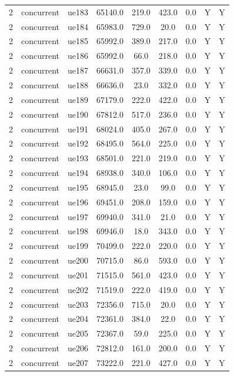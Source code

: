 \begin{table}[ht]
\begin{tabular}{|c|c|c|c|c|c|c|c|c|}
2 & concurrent & ue183 & 65140.0 & 219.0 & 423.0 & 0.0 & Y & Y \\
2 & concurrent & ue184 & 65983.0 & 729.0 & 20.0 & 0.0 & Y & Y \\
2 & concurrent & ue185 & 65992.0 & 389.0 & 217.0 & 0.0 & Y & Y \\
2 & concurrent & ue186 & 65992.0 & 66.0 & 218.0 & 0.0 & Y & Y \\
2 & concurrent & ue187 & 66631.0 & 357.0 & 339.0 & 0.0 & Y & Y \\
2 & concurrent & ue188 & 66636.0 & 23.0 & 332.0 & 0.0 & Y & Y \\
2 & concurrent & ue189 & 67179.0 & 222.0 & 422.0 & 0.0 & Y & Y \\
2 & concurrent & ue190 & 67812.0 & 517.0 & 236.0 & 0.0 & Y & Y \\
2 & concurrent & ue191 & 68024.0 & 405.0 & 267.0 & 0.0 & Y & Y \\
2 & concurrent & ue192 & 68495.0 & 564.0 & 225.0 & 0.0 & Y & Y \\
2 & concurrent & ue193 & 68501.0 & 221.0 & 219.0 & 0.0 & Y & Y \\
2 & concurrent & ue194 & 68938.0 & 340.0 & 106.0 & 0.0 & Y & Y \\
2 & concurrent & ue195 & 68945.0 & 23.0 & 99.0 & 0.0 & Y & Y \\
2 & concurrent & ue196 & 69451.0 & 208.0 & 159.0 & 0.0 & Y & Y \\
2 & concurrent & ue197 & 69940.0 & 341.0 & 21.0 & 0.0 & Y & Y \\
2 & concurrent & ue198 & 69946.0 & 18.0 & 343.0 & 0.0 & Y & Y \\
2 & concurrent & ue199 & 70499.0 & 222.0 & 220.0 & 0.0 & Y & Y \\
2 & concurrent & ue200 & 70715.0 & 86.0 & 593.0 & 0.0 & Y & Y \\
2 & concurrent & ue201 & 71515.0 & 561.0 & 423.0 & 0.0 & Y & Y \\
2 & concurrent & ue202 & 71519.0 & 222.0 & 419.0 & 0.0 & Y & Y \\
2 & concurrent & ue203 & 72356.0 & 715.0 & 20.0 & 0.0 & Y & Y \\
2 & concurrent & ue204 & 72361.0 & 384.0 & 22.0 & 0.0 & Y & Y \\
2 & concurrent & ue205 & 72367.0 & 59.0 & 225.0 & 0.0 & Y & Y \\
2 & concurrent & ue206 & 72812.0 & 161.0 & 200.0 & 0.0 & Y & Y \\
2 & concurrent & ue207 & 73222.0 & 221.0 & 427.0 & 0.0 & Y & Y \\

\end{tabular}
\end{table}
